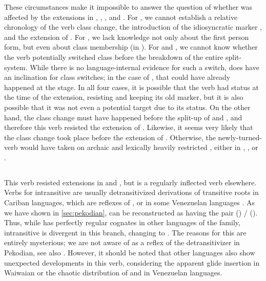 These circumstances make it impossible to answer the question of whether  was affected by the extensions in \PWai, \PTir, \carijo, and \yukpa.
For \PTir, we cannot establish a relative chronology of the verb class change, the introduction of the idiosyncratic marker , and the extension of .
For \PWai, we lack knowledge not only about the first person form, but even about class membership (in \hixka).
For \carijo and \yukpa, we cannot know whether the verb potentially switched class before the breakdown of the entire split- system.
While there is no language-internal evidence for such a switch,  does have an inclination for class switches; in the case of \carijo, that could have already happened at the \PTar stage.
In all four cases, it is possible that the verb had  status at the time of the extension, resisting and keeping its old marker, but it is also possible that it was not even a potential target due to its  status.
On the other hand, the class change must have happened before the split-up of \trio and \akuriyo, and therefore this verb resisted the extension of \akuriyo {}.
Likewise, it seems very likely that the class change took place before the extension of \PPek {}.
Otherwise, the newly-turned- verb would have taken on archaic and lexically heavily restricted , either in \PTar, \PXin, or \arara. 

\subsection{ }
\label{sec:bathe}
This verb resisted extensions in \PPek {} and \akuriyo {}, but is a regularly inflected  verb elsewhere.
Verbs for intransitive  are usually detransitivized derivations of transitive roots in Cariban languages, which are reflexes of , or  in some Venezuelan languages .
As we have shown in \cref{sec:pekodian}, \PPek can be reconstructed as having the pair  () /  ().
Thus, while \PPek {} has perfectly regular cognates in other languages of the family, intransitive  is divergent in this branch, changing  to .
The reasons for this are entirely mysterious; we are not aware of  as a reflex of the detransitivizer in Pekodian, see also \textcite[506]{meira2010origin}.
However, it should be noted that other languages also show unexpected developments in this verb, considering the apparent glide insertion in Waiwaian or the chaotic distribution of  and  in Venezuelan languages.

